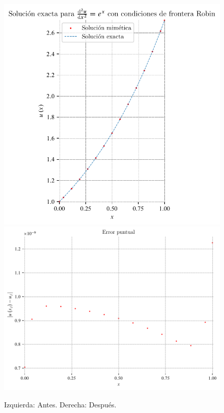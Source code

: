 \begin{problem}
\begin{figure}[ht!]
    \centering
    \includegraphics[width=.39\paperwidth]{elliptic1D.pdf}
    \includegraphics[width=.39\paperwidth]{elliptic1Derror.pdf}
    \caption{Izquierda: Antes. Derecha: Después.}
\end{figure}


\end{problem}

